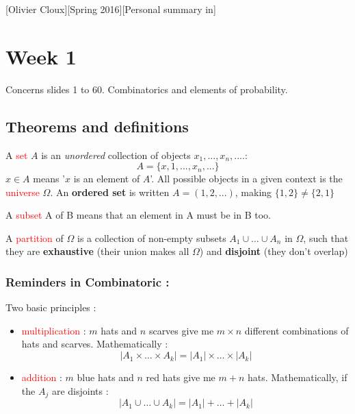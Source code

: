 \documentclass[12pt,a4paper]{article}
\begin{document}
[Olivier Cloux][Spring 2016][Personal summary in]
\newpage
\tableofcontents

\section{Week 1}
Concerns slides 1 to 60. Combinatorics and elements of probability.
\subsection{Theorems and definitions}
 A \textcolor{red}{set} $A$ is an \textit{unordered} collection of objects $x_1,...,x_n,...$.:
\begin{equation}
    A = \{x,1,...,x_n,...\}
\end{equation}
 $x \in A$ means '$x$ is an element of $A$'. All possible objects in a given context is the \textcolor{red}{universe} $\Omega$. An \textbf{ordered set} is written $A = (1,2,...)$, making $\{1,2\} \neq \{2,1\}$
 
 A \textcolor{red}{subset} A of B means that an element in A must be in B too. 

 A \textcolor{red}{partition} of $\Omega$ is a collection of non-empty subsets $A_1 \cup \ldots \cup A_n$ in $\Omega$, such that they are \textbf{exhaustive} (their union makes all $\Omega$) and \textbf{disjoint} (they don't overlap)

\subsubsection*{Reminders in Combinatoric :} Two basic principles : 
\begin{itemize}
    \item \textcolor{red}{multiplication} : $m$ hats and $n$ scarves give me $m\times n$ different combinations of hats and scarves. Mathematically : 
            \begin{equation}
                |A_1 \times \ldots \times A_k| = |A_1| \times \ldots \times |A_k|
            \end{equation}
    \item \textcolor{red}{addition} : $m$ blue hats and $n$ red hats give me $m+n$ hats. Mathematically, if the $A_j$ are disjoints :
            \begin{equation}
                |A_1 \cup \ldots \cup A_k| = |A_1| + \ldots + |A_k|
            \end{equation}
\end{itemize}
\end{document}
